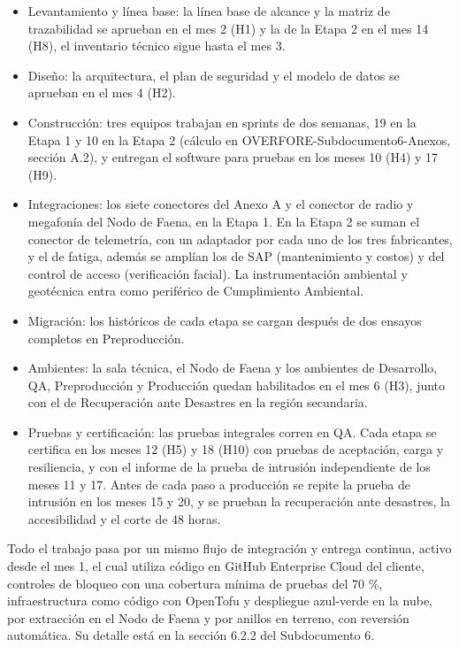 \documentclass[subdoc]{../../comun/overfore}
\begin{document}
\begin{itemize}
\item Levantamiento y línea base: la línea base de alcance y la matriz de trazabilidad se aprueban en el mes 2 (H1) y la de la Etapa 2 en el mes 14 (H8), el inventario técnico sigue hasta el mes 3.
\item Diseño: la arquitectura, el plan de seguridad y el modelo de datos se aprueban en el mes 4 (H2).
\item Construcción: tres equipos trabajan en sprints de dos semanas, 19 en la Etapa 1 y 10 en la Etapa 2 (cálculo en OVERFORE-Subdocumento6-Anexos, sección A.2), y entregan el software para pruebas en los meses 10 (H4) y 17 (H9).
\item Integraciones: los siete conectores del Anexo A y el conector de radio y megafonía del Nodo de Faena, en la Etapa 1. En la Etapa 2 se suman el conector de telemetría, con un adaptador por cada uno de los tres fabricantes, y el de fatiga, además se amplían los de SAP (mantenimiento y costos) y del control de acceso (verificación facial). La instrumentación ambiental y geotécnica entra como periférico de Cumplimiento Ambiental.
\item Migración: los históricos de cada etapa se cargan después de dos ensayos completos en Preproducción.
\item Ambientes: la sala técnica, el Nodo de Faena y los ambientes de Desarrollo, QA, Preproducción y Producción quedan habilitados en el mes 6 (H3), junto con el de Recuperación ante Desastres en la región secundaria.
\item Pruebas y certificación: las pruebas integrales corren en QA. Cada etapa se certifica en los meses 12 (H5) y 18 (H10) con pruebas de aceptación, carga y resiliencia, y con el informe de la prueba de intrusión independiente de los meses 11 y 17. Antes de cada paso a producción se repite la prueba de intrusión en los meses 15 y 20, y se prueban la recuperación ante desastres, la accesibilidad y el corte de 48 horas.
\end{itemize}
Todo el trabajo pasa por un mismo flujo de integración y entrega continua, activo desde el mes 1, el cual utiliza código en GitHub Enterprise Cloud del cliente, controles de bloqueo con una cobertura mínima de pruebas del 70 \%, infraestructura como código con OpenTofu y despliegue azul-verde en la nube, por extracción en el Nodo de Faena y por anillos en terreno, con reversión automática. Su detalle está en la sección 6.2.2 del Subdocumento 6.
\end{document}
